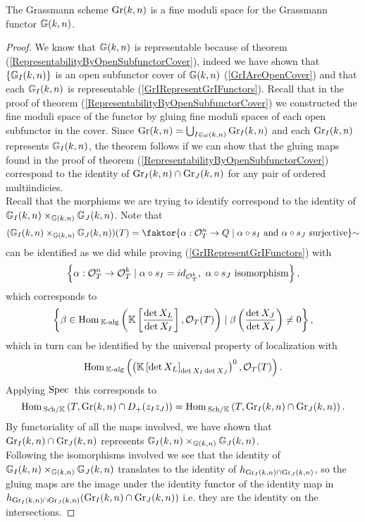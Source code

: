 \begin{theorem}\label{GrassmannianIsModuliSpace}
The Grassmann scheme $\mathrm{Gr}(k,n)$ is a fine moduli space for the Grassmann functor $\mathbb{G}(k,n)$.
\end{theorem}
\begin{proof}
We know that $\mathbb{G}(k,n)$ is representable because of theorem (\ref{RepresentabilityByOpenSubfunctorCover}), indeed we have shown that $\left\{{\mathbb{G}_I(k,n)}\right\}$ is an open subfunctor cover of $\mathbb{G}(k,n)$ (\ref{GrIAreOpenCover}) and that each $\mathbb{G}_I(k,n)$ is representable (\ref{GrIRepresentGrIFunctors}). Recall that in the proof of theorem (\ref{RepresentabilityByOpenSubfunctorCover}) we constructed the fine moduli space of the functor by gluing fine moduli spaces of each open subfunctor in the cover. Since $\mathrm{Gr}(k,n)=\bigcup_{I\in\omega(k,n)}\mathrm{Gr}_I(k,n)$ and each $\mathrm{Gr}_I(k,n)$ represents $\mathbb{G}_I(k,n)$, the theorem follows if we can show that the gluing maps found in the proof of theorem (\ref{RepresentabilityByOpenSubfunctorCover}) correspond to the identity of $\mathrm{Gr}_I(k,n)\cap \mathrm{Gr}_J(k,n)$ for any pair of ordered multiindicies.\\
Recall that the morphisms we are trying to identify correspond to the identity of $\mathbb{G}_I(k,n)\times_{\mathbb{G}(k,n)}\mathbb{G}_J(k,n)$. Note that
\[(\G_I(k,n)\times_{\G(k,n)}\G_J(k,n))(T)=\quot{\cpa{\al:\Oc^n_T\to Q\mid \al\circ s_I \text{ and }\al\circ s_J\text{ surjective}}}\sim\]
can be identified as we did while proving (\ref{GrIRepresentGrIFunctors}) with
\[\left\{{\alpha:\mathcal{O}_T^n\to \mathcal{O}^k_T\mid \alpha\circ s_I=id_{\mathcal{O}^k_T},\ \alpha\circ s_J\text{ isomorphism}}\right\},\]
which corresponds to
\[\left\{{\beta\in \mathrm{Hom}\,_{\mathbb{K}\text{-alg}}\left({\mathbb{K}\left[{\frac{\det X_L}{\det X_I}}\right],\mathcal{O}_T(T)}\right)\mid \beta\left({\frac{\det X_J}{\det X_I}}\right)\neq 0}\right\},\]
which in turn can be identified by the universal property of localization with
\[\mathrm{Hom}\,_{\mathbb{K}\text{-alg}}\left({\left({\mathbb{K}\left[{\det X_L}\right]_{\det X_I\det X_J}}\right)^0,\mathcal{O}_T(T)}\right).\]
Applying $\mathrm{Spec}\,$ this corresponds to \[\mathrm{Hom}\,_{{\mathrm{Sch}}/{\mathbb{K}}}\left({T,\mathrm{Gr}(k,n)\cap D_+(z_Iz_J)}\right)=\mathrm{Hom}\,_{{\mathrm{Sch}}/{\mathbb{K}}}\left({T,\mathrm{Gr}_I(k,n)\cap \mathrm{Gr}_J(k,n)}\right).\]
By functoriality of all the maps involved, we have shown that $\mathrm{Gr}_I(k,n)\cap \mathrm{Gr}_J(k,n)$ represents $\mathbb{G}_I(k,n)\times_{\mathbb{G}(k,n)}\mathbb{G}_J(k,n)$.\\
Following the isomorphisms involved we see that the identity of $\mathbb{G}_I(k,n)\times_{\mathbb{G}(k,n)}\mathbb{G}_J(k,n)$ translates to the identity of $h_{\mathrm{Gr}_I(k,n)\cap \mathrm{Gr}_J(k,n)}$, so the gluing maps are the image under the identity functor of the identity map in $h_{\mathrm{Gr}_I(k,n)\cap \mathrm{Gr}_J(k,n)}(\mathrm{Gr}_I(k,n)\cap \mathrm{Gr}_J(k,n))$ i.e. they are the identity on the intersections.
\end{proof}